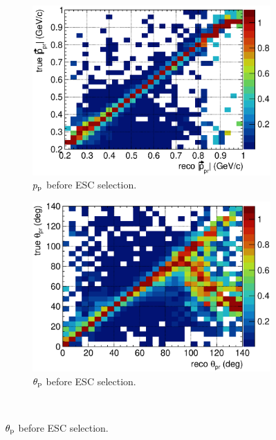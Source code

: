     \begin{figure}[ht]
        \centering
        \begin{subfigure}{\dbfigwid\textwidth}
             \centering
             \includegraphics[width=\textwidth]{figures/sel/p_pr_colnor_resmat_al13.eps}
             \caption{$p_\textrm{p}$ before ESC selection.}
             \label{subfig:esc-ppr-bfesc}
        \end{subfigure}
        \begin{subfigure}{\dbfigwid\textwidth}
             \centering
             \includegraphics[width=\textwidth]{figures/sel/theta_pr_colnor_resmat_al13.eps}
             \caption{$\theta_\textrm{p}$ before ESC selection.}
             \label{subfig:esc-tpr-bfesc}
        \end{subfigure}
        \\

\end{figure}
